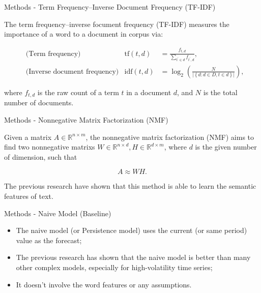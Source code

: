 \documentclass{beamer}
\begin{document}
\begin{frame}{Methods - Term Frequency–Inverse Document Frequency (TF-IDF)}

  The term frequency–inverse focument frequency (TF-IDF)   measures the importance of a word to a document in corpus via: \vspace{.25cm}

  $$
    \begin{aligned}
       & \text{(Term frequency)}             & \mathrm{tf}(t, d)  & = \frac{f_{t, d}}{\sum_{t^\prime \in d} f_{t^\prime, d}},                                     \\
       & \text{(Inverse document frequency)} & \mathrm{idf}(t, d) & = \log_2\left( \frac{N}{\left\vert \left\{ d: d \in D, t \in d \right\} \right\vert} \right),
    \end{aligned}
  $$ \vspace{.25cm}

  where $f_{t, d}$ is the raw count of a term $t$ in a document $d$, and $N$ is the total number of documents.

\end{frame}

\begin{frame}{Methods - Nonnegative Matrix Factorization (NMF)}

  Given a matrix $A \in \mathbb{R}^{n \times m}$, the nonnegative matrix factorization (NMF)  aims to find two nonnegative matrixs $W \in \mathbb{R}^{n \times d}, H \in \mathbb{R}^{d \times m}$, where $d$ is the given number of dimension, such that \vspace{.25cm}

  $$
    A \approx W H.
  $$ \vspace{.25cm}

  The previous research  have shown that this method is able to learn the semantic features of text.

\end{frame}

\begin{frame}{Methods - Naive Model (Baseline)}

  \begin{itemize}
    \item The naive model (or Persistence model) uses the current (or same period) value as the forecast; \vspace{.25cm}
    \item The previous research  has shown that the naive model is better than many other complex models, especially for high-volatility time series; \vspace{.25cm}
    \item It doesn’t involve the word features or any assumptions.
  \end{itemize}

\end{frame}
\end{document}
